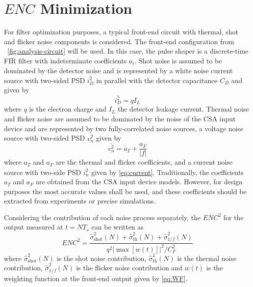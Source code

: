 \section{$\mathit{ENC}$ Minimization}

For filter optimization purposes, a typical \mbox{front-end} circuit with thermal, shot and flicker noise components is considered. The \mbox{front-end} configuration from \figurename~\ref{fig:analysis-circuit} will be used. In this case, the pulse shaper is a \mbox{discrete-time} FIR filter with indeterminate coefficients $a_i$. Shot noise is assumed to be dominated by the detector noise and is represented by a white noise current source with \mbox{two-sided} PSD $\overline{i^2_D}$ in parallel with the detector capacitance $C_D$ and given by
	\begin{equation} 
		\overline{i^2_D} = qI_L
	\end{equation}
where $q$ is the electron charge and $I_L$ the detector leakage current. Thermal noise and flicker noise are assumed to be dominated by the noise of the CSA input device and are represented by two \mbox{fully-correlated} noise sources, a voltage noise source with \mbox{two-sided} PSD $\overline{v_n^2}$ given by
	\begin{equation} 
		\overline{v_n^2} =   a_T + \frac{a_F}{|f|}
	\end{equation}
where $a_T$ and $a_F$ are the thermal and flicker coefficients, and a current noise source with \mbox{two-side} PSD $\overline{i_n^2}$ given by \eqref{eq:current}. Traditionally, the coefficients $a_T$ and $a_F$ are obtained from the CSA input device models. However, for design purposes the most accurate values shall be used, and these coefficients should be extracted from experiments \citep{bertuccio101} or precise simulations.

Considering the contribution of each noise process separately, the $\mathit{ENC}^2$ for the output measured at $t = NT_s$ can be written as 
	\begin{equation}
		\mathit{ENC}^2 = \frac{\hat{\sigma}_\text{shot}^2(N)+\hat{\sigma}_\text{th}^2(N) +  \hat{\sigma}_{1/f}^2(N)}{q^2\left| \max[w(t)]		\right|^2/C_F^2}\label{eq:enc}
	\end{equation}
where $\hat{\sigma}_\text{shot}^2(N)$ is the shot noise contribution, $\hat{\sigma}_\text{th}^2(N)$ is the thermal noise contribution, $\hat{\sigma}_{1/f}^2(N)$ is the flicker noise contribution and $w(t)$ is the weighting function at the \mbox{front-end} output given by \eqref{eq:WF}.

